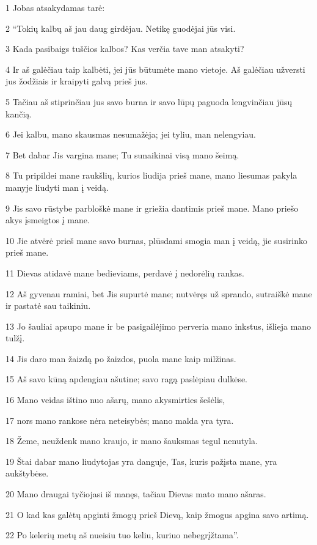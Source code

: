 \par 1 Jobas atsakydamas tarė: 
\par 2 “Tokių kalbų aš jau daug girdėjau. Netikę guodėjai jūs visi. 
\par 3 Kada pasibaigs tuščios kalbos? Kas verčia tave man atsakyti? 
\par 4 Ir aš galėčiau taip kalbėti, jei jūs būtumėte mano vietoje. Aš galėčiau užversti jus žodžiais ir kraipyti galvą prieš jus. 
\par 5 Tačiau aš stiprinčiau jus savo burna ir savo lūpų paguoda lengvinčiau jūsų kančią. 
\par 6 Jei kalbu, mano skausmas nesumažėja; jei tyliu, man nelengviau. 
\par 7 Bet dabar Jis vargina mane; Tu sunaikinai visą mano šeimą. 
\par 8 Tu pripildei mane raukšlių, kurios liudija prieš mane, mano liesumas pakyla manyje liudyti man į veidą. 
\par 9 Jis savo rūstybe parbloškė mane ir griežia dantimis prieš mane. Mano priešo akys įsmeigtos į mane. 
\par 10 Jie atvėrė prieš mane savo burnas, plūsdami smogia man į veidą, jie susirinko prieš mane. 
\par 11 Dievas atidavė mane bedieviams, perdavė į nedorėlių rankas. 
\par 12 Aš gyvenau ramiai, bet Jis supurtė mane; nutvėręs už sprando, sutraiškė mane ir pastatė sau taikiniu. 
\par 13 Jo šauliai apsupo mane ir be pasigailėjimo perveria mano inkstus, išlieja mano tulžį. 
\par 14 Jis daro man žaizdą po žaizdos, puola mane kaip milžinas. 
\par 15 Aš savo kūną apdengiau ašutine; savo ragą paslėpiau dulkėse. 
\par 16 Mano veidas ištino nuo ašarų, mano akys­mirties šešėlis, 
\par 17 nors mano rankose nėra neteisybės; mano malda yra tyra. 
\par 18 Žeme, neuždenk mano kraujo, ir mano šauksmas tegul nenutyla. 
\par 19 Štai dabar mano liudytojas yra danguje, Tas, kuris pažįsta mane, yra aukštybėse. 
\par 20 Mano draugai tyčiojasi iš manęs, tačiau Dievas mato mano ašaras. 
\par 21 O kad kas galėtų apginti žmogų prieš Dievą, kaip žmogus apgina savo artimą. 
\par 22 Po kelerių metų aš nueisiu tuo keliu, kuriuo nebegrįžtama”.



